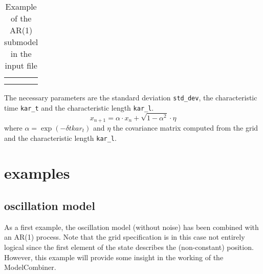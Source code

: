 \documentclass[a4paper,12pt]{article}
\begin{document}
\begin{table}
\begin{tabular}{|l|}
\hline
{\small
\begin{minipage}{15cm}

\begin{verbatim}

       <modelbuild_sp>
          <special_ar1>
            <tag>noise-bc-n</tag>
            <parameters std_dev="1.0" kar_t="105.90" kar_l="0.5">
            </parameters>
            <grid>
               <type_id>2D</type_id>
               <gridsize  nx="4"  ny="1">  </gridsize>
               <gridparams x_origin="0.0" y_origin="2.5"
                          dx="0.5" dy="0.0">
               </gridparams>
            </grid>
          </special_ar1>

       </modelbuild_sp>




\end{verbatim}



{\em submodel definition: an AR(1) noise model} \\[1ex]
\end{minipage}}\\
\hline
\end{tabular}
\caption{Example of the AR(1) submodel in the input file}
\label{Tab: ar1}
\end{table}

The necessary parameters are the standard deviation {\tt std\_dev}, the
characteristic time {\tt kar\_t} and the characteristic length {\tt kar\_l}.
$$
x_{n+1} = \alpha \cdot x_{n} + \sqrt{1 - \alpha^2} \cdot\eta
$$
where $\alpha = \exp{(- \delta t  kar_t)} $ and $\eta$ the covariance matrix
  computed from the grid and the characteristic length {\tt kar\_l}.


\section{examples}
\subsection{oscillation model}
As a first example, the oscillation model (without noise) has been 
combined with an AR(1) process. Note that the grid specification is in this
case not entirely logical since the first element of the state describes the
(non-constant) position. However, this example will provide some insight in the
working of the ModelCombiner.
\end{document}
